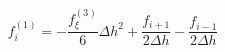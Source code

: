 \begin{equation} 
f^{{(1)}}_{i} = - \frac{f^{{(3)}}_{{\xi}}}{6} {\Delta h}^{2} + \frac{f_{{i+1}}}{2 {\Delta h}} - \frac{f_{{i-1}}}{2 {\Delta h}}
 \end{equation} 
